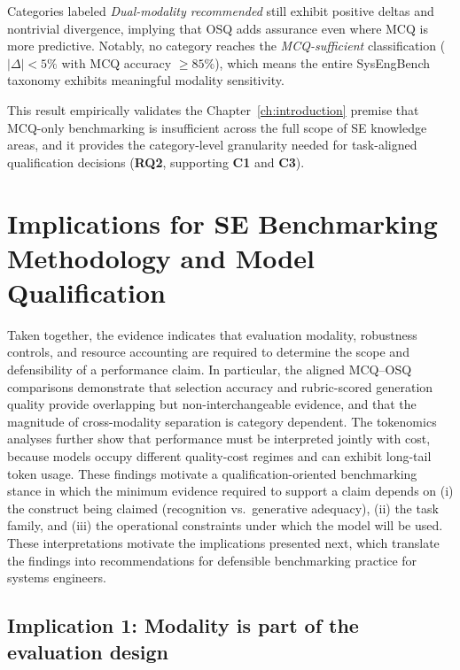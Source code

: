Categories labeled \emph{Dual-modality recommended} still exhibit positive deltas and nontrivial divergence, implying that OSQ adds assurance even where MCQ is more predictive. Notably, no category reaches the \textit{MCQ-sufficient} classification ($|\Delta| < 5\%$ with MCQ accuracy $\geq 85\%$), which means the entire SysEngBench taxonomy exhibits meaningful modality sensitivity.

This result empirically validates the Chapter~\ref{ch:introduction} premise that MCQ-only benchmarking is insufficient across the full scope of SE knowledge areas, and it provides the category-level granularity needed for task-aligned qualification decisions (\textbf{RQ2}, supporting \textbf{C1} and \textbf{C3}).


\section{Implications for SE Benchmarking Methodology and Model Qualification}\label{sec:implications_benchmarking}

Taken together, the evidence indicates that evaluation modality, robustness controls, and resource accounting are required to determine the scope and defensibility of a performance claim. In particular, the aligned MCQ--OSQ comparisons demonstrate that selection accuracy and rubric-scored generation quality provide overlapping but non-interchangeable evidence, and that the magnitude of cross-modality separation is category dependent. The tokenomics analyses further show that performance must be interpreted jointly with cost, because models occupy different quality-cost regimes and can exhibit long-tail token usage. These findings motivate a qualification-oriented benchmarking stance in which the minimum evidence required to support a claim depends on (i) the construct being claimed (recognition vs.\ generative adequacy), (ii) the task family, and (iii) the operational constraints under which the model will be used. These interpretations motivate the implications presented next, which translate the findings into recommendations for defensible benchmarking practice for systems engineers. 



\subsection{Implication 1: Modality is part of the evaluation design}
\label{subsec:ch5_imp_claim_tiers}

